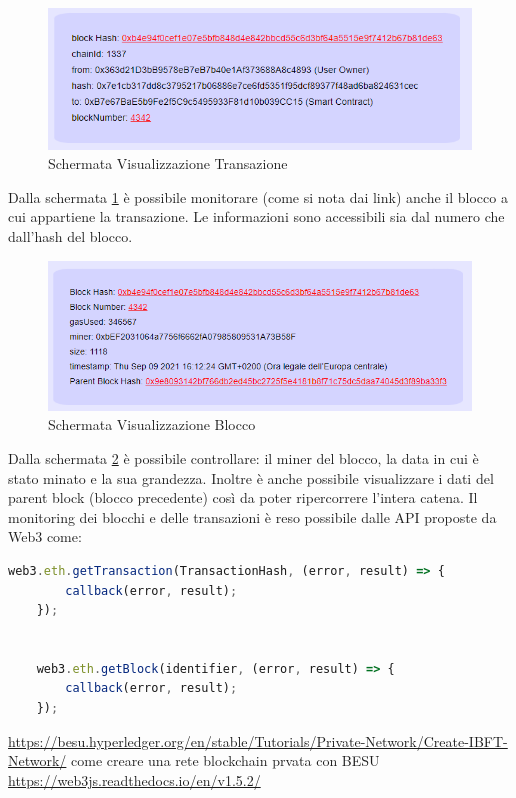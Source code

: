 \documentclass[11pt,a4paper,titlepage,twoside,openright]{report}
\begin{document}
\begin{figure}[h]
	\includegraphics[width=\textwidth]{Transaction_Print}
	\centering
	\caption{Schermata Visualizzazione Transazione}
	\label{fig:Transaction_Print}
\end{figure}

Dalla schermata \ref{fig:Transaction_Print} è possibile monitorare (come si nota dai link) anche il blocco a cui appartiene la transazione. Le informazioni sono accessibili sia dal numero che dall'hash del blocco.
\begin{figure}[h]
	\includegraphics[width=\textwidth]{Block_Print}
	\centering
	\caption{Schermata Visualizzazione Blocco}
	\label{fig:Block_Print}
\end{figure}

Dalla schermata \ref{fig:Block_Print} è possibile controllare: il miner del blocco, la data in cui è stato minato e la sua grandezza. Inoltre è anche possibile visualizzare i dati del parent block (blocco precedente) così da poter ripercorrere l'intera catena. Il monitoring dei blocchi e delle transazioni è reso possibile dalle API proposte da Web3 come: 

\begin{lstlisting}[language=JavaScript]
	web3.eth.getTransaction(TransactionHash, (error, result) => {
		callback(error, result);
	});
	
	
	web3.eth.getBlock(identifier, (error, result) => {
		callback(error, result);
	});
\end{lstlisting}

\begin{thebibliography}{1}
\bibitem{} \url{https://besu.hyperledger.org/en/stable/Tutorials/Private-Network/Create-IBFT-Network/} come creare una rete blockchain prvata con BESU
\bibitem{} \url{https://web3js.readthedocs.io/en/v1.5.2/}
\end{thebibliography}
\end{document}
